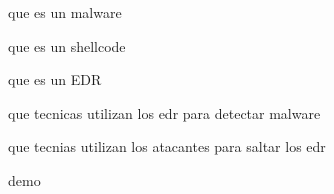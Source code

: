 que es un malware

que es un shellcode

que es un EDR

que tecnicas utilizan los edr para detectar malware

que tecnias utilizan los atacantes para saltar los edr

demo
